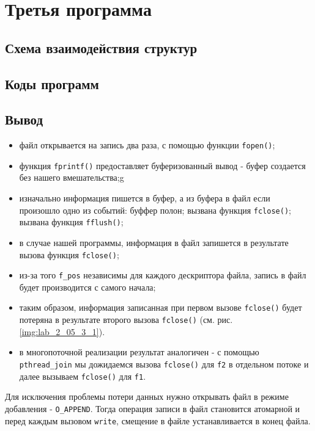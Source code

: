 \section{Третья программа}

\subsection{Схема взаимодействия структур}


\subsection{Коды программ}





\clearpage

\subsection*{Вывод}

\begin{itemize}
	\item файл открывается на запись два раза, с помощью функции \texttt{fopen()};
	\item функция \texttt{fprintf()} предоставляет буферизованный вывод - буфер создается без нашего вмешательства;g
	\item изначально информация пишется в буфер, а из буфера в файл если произошло одно из событий:
		\subitem буффер полон;
		\subitem вызвана функция \texttt{fclose()};
		\subitem вызвана функция \texttt{fflush()};
	\item в случае нашей программы, информация в файл запишется в результате вызова функция \texttt{fclose()};
	\item из-за того \texttt{f\_pos} независимы для каждого дескриптора файла, запись в файл будет производится с самого начала;
	\item таким образом, информация записанная при первом вызове \texttt{fclose()} будет потеряна в результате второго вызова \texttt{fclose()} (см. рис. \ref{img:lab_2_05_3_1}).
	\item в многопоточной реализации результат аналогичен - с помощью \texttt{pthread\_join} мы дожидаемся вызова \texttt{fclose()} для \texttt{f2} в отдельном потоке и далее вызываем \texttt{fclose()} для \texttt{f1}.
\end{itemize}

Для исключения проблемы потери данных нужно открывать файл в режиме добавления - \texttt{O\_APPEND}. Тогда операция записи в файл становится атомарной и перед каждым вызовом \texttt{write}, смещение в файле устанавливается в конец файла.
